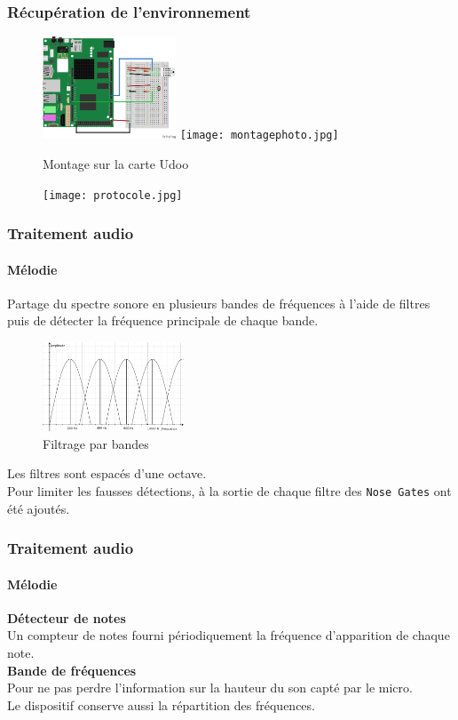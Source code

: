 \documentclass{beamer}
\begin{document}
\begin{frame}
\frametitle{Récupération de l'environnement}
\begin{figure}
  \centering
  \includegraphics[width=150px]{montage.jpg}  
  \hspace{15px}
  \texttt{[image: montagephoto.jpg]} 
	\caption{Montage sur la carte Udoo}
\end{figure}
\begin{figure}
\centering
\vspace{-0.5cm}
\texttt{[image: protocole.jpg]}
\end{figure}
\end{frame}

\begin{frame}
\frametitle{Traitement audio}
\framesubtitle{Mélodie}

Partage du spectre sonore en plusieurs bandes de fréquences à l'aide de filtres puis de détecter la fréquence principale de chaque bande.
\begin{figure}
\centering
\includegraphics[height=100px]{filtre.jpg}
\caption{Filtrage par bandes}
\end{figure}
Les filtres sont espacés d'une octave.\\
Pour limiter les fausses détections, à la sortie de chaque filtre des \texttt{Nose Gates} ont été ajoutés. 
\end{frame}


\begin{frame}
\frametitle{Traitement audio}
\framesubtitle{Mélodie}
\textbf{Détecteur de notes}\\
Un compteur de notes fourni périodiquement la fréquence d'apparition de chaque note.
\\ 
\textbf{Bande de fréquences}\\
Pour ne pas perdre l'information sur la hauteur du son capté par le micro.\\
Le dispositif conserve aussi la répartition des fréquences.

\end{frame}
\end{document}
